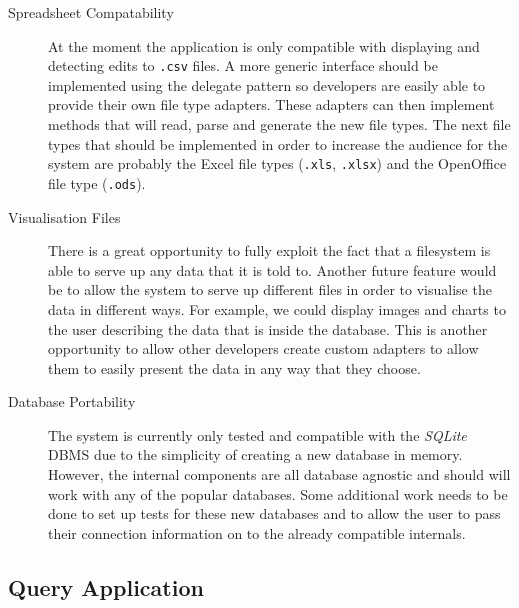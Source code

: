 \begin{description}

	\item[Spreadsheet Compatability] \hfill

		At the moment the application is only compatible with displaying and
		detecting edits to \texttt{.csv} files. A more generic interface should
		be implemented using the delegate pattern so developers are easily able
		to provide their own file type adapters. These adapters can then
		implement methods that will read, parse and generate the new file
		types. The next file types that should be implemented in order to
		increase the audience for the system are probably the Excel file types
		(\texttt{.xls}, \texttt{.xlsx}) and the OpenOffice file type
		(\texttt{.ods}).

	\item[Visualisation Files] \hfill

		\nopagebreak

		There is a great opportunity to fully exploit the fact that
		a filesystem is able to serve up any data that it is told to. Another
		future feature would be to allow the system to serve up different files
		in order to visualise the data in different ways. For example, we could
		display images and charts to the user describing the data that is
		inside the database. This is another opportunity to allow other
		developers create custom adapters to allow them to easily present the
		data in any way that they choose.

	\item[Database Portability] \hfill

		The system is currently only tested and compatible with the
		\emph{SQLite} \ac{DBMS} due to the simplicity of creating a new
		database in memory. However, the internal components are all database
		agnostic and should will work with any of the popular databases. Some
		additional work needs to be done to set up tests for these new
		databases and to allow the user to pass their connection information on
		to the already compatible internals.

\end{description}

\subsection{Query Application}

